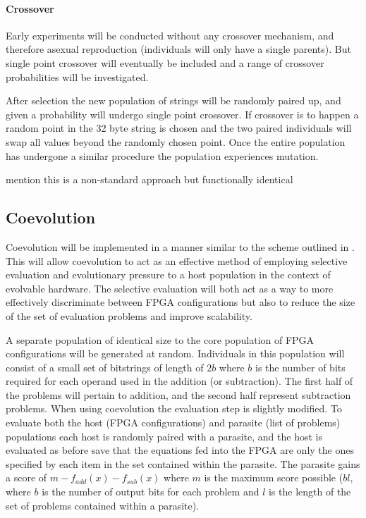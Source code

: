\paragraph{Crossover}
Early experiments will be conducted without any crossover mechanism, and therefore
asexual reproduction (individuals will only have a single parents). But single
point crossover will eventually be included and a range of crossover probabilities
will be investigated.

After selection the new population of strings will be randomly paired up, and given
a probability will undergo single point crossover. If crossover is to happen a
random point in the 32 byte string is chosen and the two paired individuals will
swap all values beyond the randomly chosen point. Once the entire population has
undergone a similar procedure the population experiences mutation.

\todo mention this is a non-standard approach but functionally identical

\subsection{Coevolution}

Coevolution will be implemented in a manner similar to the scheme outlined in
\cite{6790490}.
This will allow coevolution to act as an effective method of employing selective
evaluation and evolutionary pressure to a host population in the context of
evolvable hardware. The selective evaluation will both act as a way to more effectively
discriminate between FPGA configurations but also to reduce the size of the
set of evaluation problems and improve scalability.

A separate population of identical size to the core population of FPGA configurations
will be generated at random. Individuals in this population will consist of a small set
of bitstrings of length of $2b$ where $b$ is the number of bits required for
each operand used in the addition (or subtraction). The first half of the problems
will pertain to addition, and the second half represent subtraction problems.
When using coevolution the
evaluation step is slightly modified. To evaluate both the host (FPGA
configurations) and parasite (list of problems) populations each host is randomly
paired with a parasite, and the host is evaluated as before save that the equations
fed into the FPGA are only the ones specified by each item in the set contained within
the parasite. The parasite gains a score of $m - f_{add}(x) - f_{sub}(x)$ where
$m$ is the maximum score possible ($bl$, where $b$ is the number of output bits for
each problem and $l$ is the length of the set of problems contained within a
parasite).

